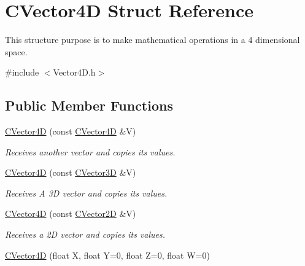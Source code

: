 \hypertarget{struct_c_vector4_d}{}\section{C\+Vector4D Struct Reference}
\label{struct_c_vector4_d}


This structure purpose is to make mathematical operations in a 4 dimensional space.  




{\ttfamily \#include $<$Vector4\+D.\+h$>$}

\subsection*{Public Member Functions}
\begin{DoxyCompactItemize}
\item 
\hyperlink{struct_c_vector4_d_ac403e65891d24940032f134aab7ad16c}{C\+Vector4D} (const \hyperlink{struct_c_vector4_d}{C\+Vector4D} \&V)\hypertarget{struct_c_vector4_d_ac403e65891d24940032f134aab7ad16c}{}\label{struct_c_vector4_d_ac403e65891d24940032f134aab7ad16c}

\begin{DoxyCompactList}\small\item\em Receives another vector and copies its values. \end{DoxyCompactList}\item 
\hyperlink{struct_c_vector4_d_aa5a933399e4e3a3ac889fdbfb5794533}{C\+Vector4D} (const \hyperlink{struct_c_vector3_d}{C\+Vector3D} \&V)\hypertarget{struct_c_vector4_d_aa5a933399e4e3a3ac889fdbfb5794533}{}\label{struct_c_vector4_d_aa5a933399e4e3a3ac889fdbfb5794533}

\begin{DoxyCompactList}\small\item\em Receives A 3D vector and copies its values. \end{DoxyCompactList}\item 
\hyperlink{struct_c_vector4_d_a7e05bc43874222cf6b8c94ac3197757d}{C\+Vector4D} (const \hyperlink{struct_c_vector2_d}{C\+Vector2D} \&V)\hypertarget{struct_c_vector4_d_a7e05bc43874222cf6b8c94ac3197757d}{}\label{struct_c_vector4_d_a7e05bc43874222cf6b8c94ac3197757d}

\begin{DoxyCompactList}\small\item\em Receives a 2D vector and copies its values. \end{DoxyCompactList}\item 
\hyperlink{struct_c_vector4_d_a04ebfffe36eee071f8940cbd1b166cee}{C\+Vector4D} (float X, float Y=0, float Z=0, float W=0)\hypertarget{struct_c_vector4_d_a04ebfffe36eee071f8940cbd1b166cee}{}\label{struct_c_vector4_d_a04ebfffe36eee071f8940cbd1b166cee}


\end{DoxyCompactItemize}
